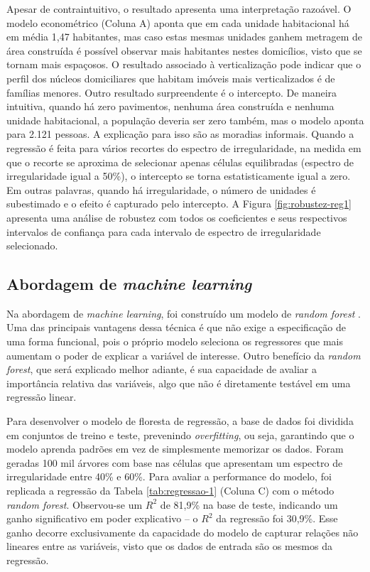 Apesar de contraintuitivo, o resultado apresenta uma interpretação razoável. O modelo econométrico (Coluna A) aponta que em cada unidade habitacional há em média 1,47 habitantes, mas caso estas mesmas unidades ganhem metragem de área construída é possível observar mais habitantes nestes domicílios, visto que se tornam mais espaçosos. O resultado associado à verticalização pode indicar que o perfil dos núcleos domiciliares que habitam imóveis mais verticalizados é de famílias menores. Outro resultado surpreendente é o intercepto. De maneira intuitiva, quando há zero pavimentos, nenhuma área construída e nenhuma unidade habitacional, a população deveria ser zero também, mas o modelo aponta para 2.121 pessoas. A explicação para isso são as moradias informais. Quando a regressão é feita para vários recortes do espectro de irregularidade, na medida em que o recorte se aproxima de selecionar apenas células equilibradas (espectro de irregularidade igual a 50\%), o intercepto se torna estatisticamente igual a zero. Em outras palavras, quando há irregularidade, o número de unidades é subestimado e o efeito é capturado pelo intercepto. A Figura \ref{fig:robustez-reg1} apresenta uma análise de robustez com todos os coeficientes e seus respectivos intervalos de confiança para cada intervalo de espectro de irregularidade selecionado.

\subsection{Abordagem de \textit{machine learning}}
\label{subsec:randfor}

Na abordagem de \textit{machine learning}, foi construído um modelo de \textit{random forest} \cite{wright2015ranger}. Uma das principais vantagens dessa técnica é que não exige a especificação de uma forma funcional, pois o próprio modelo seleciona os regressores que mais aumentam o poder de explicar a variável de interesse. Outro benefício da \textit{random forest}, que será explicado melhor adiante, é sua capacidade de avaliar a importância relativa das variáveis, algo que não é diretamente testável em uma regressão linear.


Para desenvolver o modelo de floresta de regressão, a base de dados foi dividida em conjuntos de treino e teste, prevenindo \textit{overfitting}, ou seja, garantindo que o modelo aprenda padrões em vez de simplesmente memorizar os dados. Foram geradas 100 mil árvores com base nas células que apresentam um espectro de irregularidade entre 40\% e 60\%. Para avaliar a performance do modelo, foi replicada a regressão da Tabela \ref{tab:regressao-1} (Coluna C) com o método \textit{random forest}. Observou-se um $R^2$ de 81,9\% na base de teste, indicando um ganho significativo em poder explicativo -- o $R^2$ da regressão foi 30,9\%. Esse ganho decorre exclusivamente da capacidade do modelo de capturar relações não lineares entre as variáveis, visto que os dados de entrada são os mesmos da regressão.

